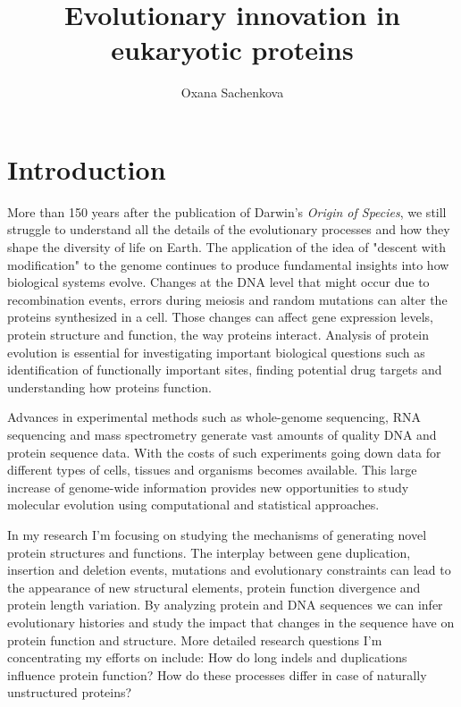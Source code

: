 \documentclass[11pt, a4paper,oneside]{report}
\newcommand{\mychapter}[2]{
    \setcounter{chapter}{#1}
    \setcounter{section}{0}
    \chapter*{#2}
    \addcontentsline{toc}{chapter}{#2}
}
\begin{document}
\title{Evolutionary innovation in eukaryotic proteins}
\author{Oxana Sachenkova}
\date{}
\maketitle


\mychapter{0}{Introduction}
More than 150 years after the publication of Darwin's {\itshape Origin of Species}, we still struggle to understand all the details of the evolutionary processes and how they shape the diversity of life on Earth. The application of the idea of "descent with modification" to the genome continues to produce fundamental insights into how biological systems evolve. Changes at the DNA level that might occur due to recombination events, errors during meiosis and random mutations can alter the proteins synthesized in a cell. Those changes can affect gene expression levels, protein structure and function, the way proteins interact. Analysis of protein evolution is essential for investigating important biological questions such as identification of functionally important sites, finding potential drug targets and understanding how proteins function.
  
Advances in experimental methods such as whole-genome sequencing, RNA sequencing and mass spectrometry generate vast amounts of quality DNA and protein sequence data.  With the costs of such experiments going down data for different types of cells, tissues and organisms becomes available. This large increase of genome-wide information provides new opportunities to study molecular evolution using computational and statistical approaches.

In my research I'm focusing on studying the mechanisms of generating novel protein structures and functions. The interplay between gene duplication, insertion and deletion events, mutations and evolutionary constraints can lead to the appearance of new structural elements,  
protein function divergence and protein length variation. By analyzing protein and DNA sequences we can infer evolutionary histories and study the impact that changes in the sequence have on protein function and structure.  More detailed research questions I'm concentrating my efforts on include: How do long indels and duplications influence protein function? How do these processes differ in case of naturally unstructured proteins? 
\end{document}
